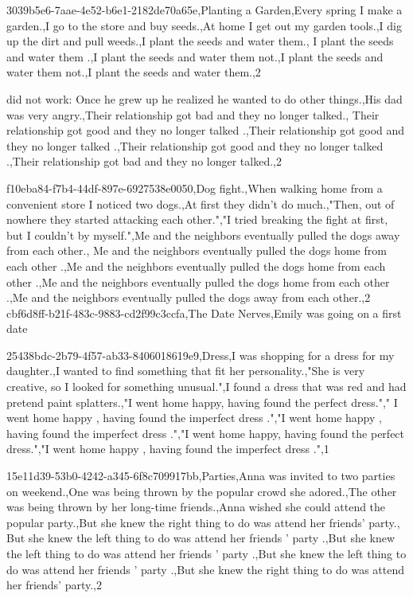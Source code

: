 \documentclass{article}
\begin{document}
3039b5e6-7aae-4e52-b6e1-2182de70a65e,Planting a Garden,Every spring I make a garden.,I go to the store and buy seeds.,At home I get out my garden tools.,I dig up the dirt and pull weeds.,I plant the seeds and water them., I plant the seeds and water them .,I plant the seeds and water them not.,I plant the seeds and water them not.,I plant the seeds and water them.,2


did not work:
Once he grew up he realized he wanted to do other things.,His dad was very angry.,Their relationship got bad and they no longer talked., Their relationship got good and they no longer talked .,Their relationship got good and they no longer talked .,Their relationship got good and they no longer talked .,Their relationship got bad and they no longer talked.,2


f10eba84-f7b4-44df-897e-6927538e0050,Dog fight.,When walking home from a convenient store I noticed two dogs.,At first they didn't do much.,"Then, out of nowhere they started attacking each other.","I tried breaking the fight at first, but I couldn't by myself.",Me and the neighbors eventually pulled the dogs away from each other., Me and the neighbors eventually pulled the dogs home from each other .,Me and the neighbors eventually pulled the dogs home from each other .,Me and the neighbors eventually pulled the dogs home from each other .,Me and the neighbors eventually pulled the dogs away from each other.,2
cbf6d8ff-b21f-483c-9883-cd2f99c3ccfa,The Date Nerves,Emily was going on a first date


25438bdc-2b79-4f57-ab33-8406018619e9,Dress,I was shopping for a dress for my daughter.,I wanted to find something that fit her personality.,"She is very creative, so I looked for something unusual.",I found a dress that was red and had pretend paint splatters.,"I went home happy, having found the perfect dress."," I went home happy , having found the imperfect dress .","I went home happy , having found the imperfect dress .","I went home happy, having found the perfect dress.","I went home happy , having found the imperfect dress .",1

15e11d39-53b0-4242-a345-6f8c709917bb,Parties,Anna was invited to two parties on weekend.,One was being thrown by the popular crowd she adored.,The other was being thrown by her long-time friends.,Anna wished she could attend the popular party.,But she knew the right thing to do was attend her friends' party., But she knew the left thing to do was attend her friends ' party .,But she knew the left thing to do was attend her friends ' party .,But she knew the left thing to do was attend her friends ' party .,But she knew the right thing to do was attend her friends' party.,2
\end{document}
